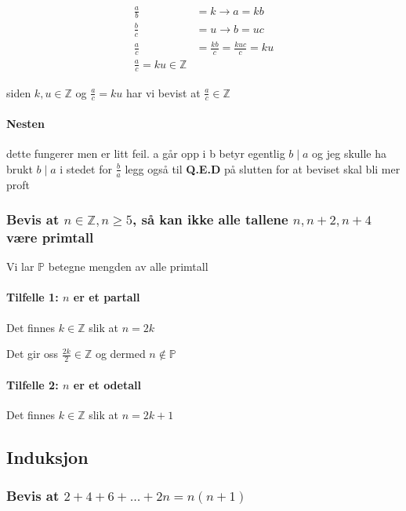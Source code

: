 \documentclass{article}
\begin{document}
\begin{align*}
    \frac{a}{b} &= k \rightarrow a = kb \\
    \frac{b}{c} &= u \rightarrow b = uc \\
    \frac{a}{c} &= \frac{kb}{c} = \frac{kuc}{c}=ku \\
    \frac{a}{c}=ku \in \mathbb{Z}
\end{align*}

siden $k,u \in \mathbb{Z}$ og $\frac{a}{c}=ku$ har vi bevist at $\frac{a}{c} \in \mathbb{Z}$

\paragraph{Nesten}

dette fungerer men er litt feil. a går opp i b betyr egentlig $b \mid a$
og jeg skulle ha brukt $b \mid a$ i stedet for $\frac{b}{a}$
legg også til \textbf{Q.E.D} på slutten for at beviset skal bli mer proft

\subsubsection{Bevis at $n \in \mathbb{Z}, n \geq 5$, så kan ikke alle tallene $n, n+2, n+4$ være primtall}

Vi lar $\mathbb{P}$ betegne mengden av alle primtall

\paragraph{Tilfelle 1: $n$ er et partall}

Det finnes $k \in \mathbb{Z}$ slik at $n=2k$

Det gir oss $\frac{2k}{2} \in \mathbb{Z}$ og dermed $n \notin \mathbb{P}$

\paragraph{Tilfelle 2: $n$ er et odetall}

Det finnes $k \in \mathbb{Z}$ slik at $n=2k+1$

\subsection{Induksjon}

\subsubsection{Bevis at $2+4+6+...+2n=n(n+1)$}
\end{document}
